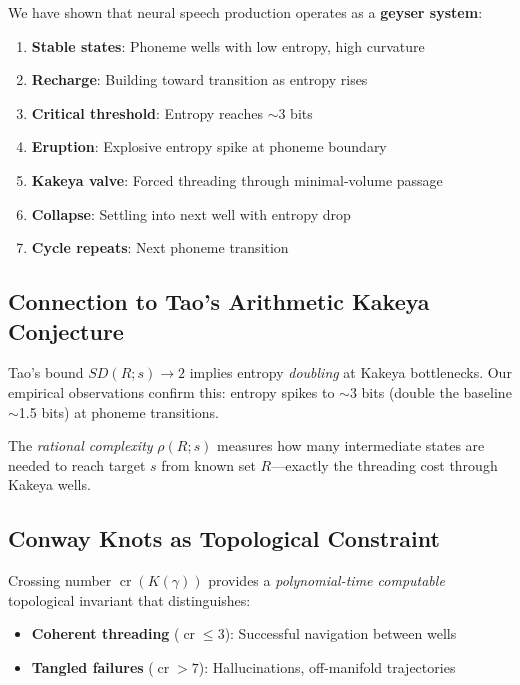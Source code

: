 \documentclass[12pt]{article}
\begin{document}
We have shown that neural speech production operates as a \textbf{geyser system}:

\begin{enumerate}
\item \textbf{Stable states}: Phoneme wells with low entropy, high curvature
\item \textbf{Recharge}: Building toward transition as entropy rises
\item \textbf{Critical threshold}: Entropy reaches $\sim$3 bits
\item \textbf{Eruption}: Explosive entropy spike at phoneme boundary
\item \textbf{Kakeya valve}: Forced threading through minimal-volume passage
\item \textbf{Collapse}: Settling into next well with entropy drop
\item \textbf{Cycle repeats}: Next phoneme transition
\end{enumerate}

\subsection{Connection to Tao's Arithmetic Kakeya Conjecture}

Tao's bound $SD(R;s) \to 2$ implies entropy \emph{doubling} at Kakeya bottlenecks. Our empirical observations confirm this: entropy spikes to $\sim$3 bits (double the baseline $\sim$1.5 bits) at phoneme transitions.

The \emph{rational complexity} $\rho(R;s)$ measures how many intermediate states are needed to reach target $s$ from known set $R$---exactly the threading cost through Kakeya wells.

\subsection{Conway Knots as Topological Constraint}

Crossing number $\operatorname{cr}(K(\gamma))$ provides a \emph{polynomial-time computable} topological invariant that distinguishes:

\begin{itemize}
\item \textbf{Coherent threading} ($\operatorname{cr} \le 3$): Successful navigation between wells
\item \textbf{Tangled failures} ($\operatorname{cr} > 7$): Hallucinations, off-manifold trajectories
\end{itemize}
\end{document}
